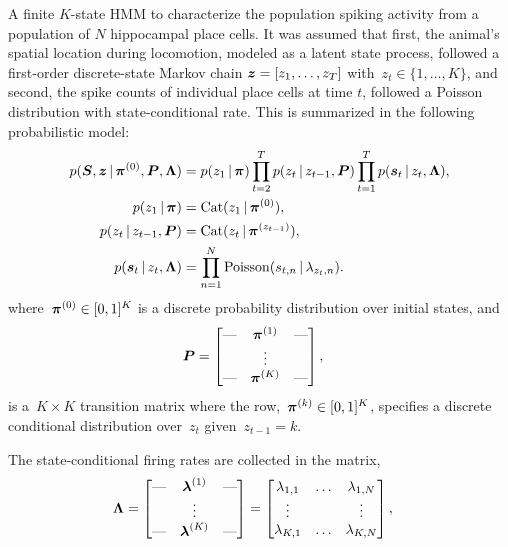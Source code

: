A finite $K$-state HMM to characterize the population spiking activity
from a population of $N$ hippocampal place cells.  It was assumed that
first, the animal's spatial location during locomotion, modeled as a
latent state process, followed a first-order discrete-state Markov
chain ${\boldsymbol{z} = \left[ z_1, \ldots, z_T\right]}$
with~$z_t \in \{1, \ldots, K\}$, and second, the spike counts of
individual place cells at time $t$, followed a Poisson distribution
with state-conditional rate. This is summarized in the following
probabilistic model:
\begin{align}
p(\boldsymbol{S}, \boldsymbol{z} \,|\, \boldsymbol{\pi}^{(0)}, \boldsymbol{P}, \boldsymbol{\Lambda}) 
  &= p(z_1\,|\, \boldsymbol{\pi}) \prod_{t=2}^T p(z_t \,|\, z_{t-1}, \boldsymbol{P}) 
    \prod_{t=1}^T p(\boldsymbol{s}_t \,|\, z_t, \boldsymbol{\Lambda}),\\
  \nonumber 
  p(z_1 \,|\, \boldsymbol{\pi}) &= \mathrm{Cat}(z_1 \,|\, \boldsymbol{\pi}^{(0)}), \\
  \nonumber 
  p(z_t \,|\, z_{t-1}, \boldsymbol{P}) &= \mathrm{Cat}(z_t \,|\, \boldsymbol{\pi}^{(z_{t-1})}), \\
  \nonumber 
  p(\boldsymbol{s}_t \,|\, z_t, \boldsymbol{\Lambda}) &= \prod_{n=1}^N \mathrm{Poisson}(s_{t,n} \,|\, \lambda_{z_t,n}).
\end{align}
where~$\boldsymbol{\pi}^{(0)} \in [0,1]^K$ is a discrete probability distribution over
initial states, and
\begin{align*}
  \boldsymbol{P} &=
        \begin{bmatrix}
          \text{---} &  \boldsymbol{\pi}^{(1)}  & \text{---} \\
            &  \vdots &   \\
          \text{---} &  \boldsymbol{\pi}^{(K)}  & \text{---}
        \end{bmatrix},
\end{align*}
is a~${K \times K}$ transition matrix where the row,~${\boldsymbol{\pi}^{(k)} \in
  [0,1]^K}$, specifies a discrete conditional distribution over~$z_t$
given~${z_{t-1}=k}$. 

The state-conditional firing rates are collected in the matrix,
\begin{align*}
  \boldsymbol{\Lambda} 
  &=
    \begin{bmatrix}
      \text{---} &  \boldsymbol{\lambda}^{(1)}  & \text{---} \\
      &  \vdots &   \\
      \text{---} &  \boldsymbol{\lambda}^{(K)}  & \text{---}
    \end{bmatrix}
   =
    \begin{bmatrix}
      \lambda_{1,1} & \ldots  & \lambda_{1,N}  \\
      \vdots        &         & \vdots  \\
      \lambda_{K,1} &  \ldots & \lambda_{K,N} 
    \end{bmatrix}, 
\end{align*}


